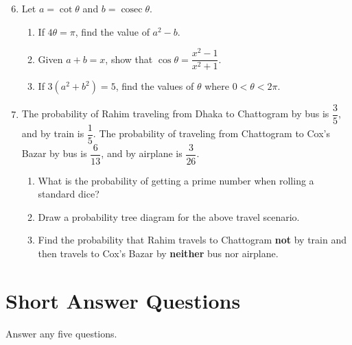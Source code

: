 \documentclass[12pt]{article}
\newcommand{\cosec}{\mathop{\mathrm{cosec}}}
\begin{document}
\begin{enumerate}
    \setcounter{enumi}{5}
    \item Let \( a = \cot\theta \) and \( b = \cosec\theta \).
    \begin{enumerate}
        \item If \( 4\theta = \pi \), find the value of \( a^2 - b \).
        \item Given \( a + b = x \), show that \( \cos\theta = \dfrac{x^2 - 1}{x^2 + 1} \).
        \item If \( 3(a^2 + b^2) = 5 \), find the values of \( \theta \) where \( 0 < \theta < 2\pi \).
    \end{enumerate}

    \item The probability of Rahim traveling from Dhaka to Chattogram by bus is \( \dfrac{3}{5} \), and by train is \( \dfrac{1}{5} \). The probability of traveling from Chattogram to Cox’s Bazar by bus is \( \dfrac{6}{13} \), and by airplane is \( \dfrac{3}{26} \).
    \begin{enumerate}
        \item What is the probability of getting a prime number when rolling a standard dice?
        \item Draw a probability tree diagram for the above travel scenario.
        \item Find the probability that Rahim travels to Chattogram \textbf{not} by train and then travels to Cox’s Bazar by \textbf{neither} bus nor airplane.
    \end{enumerate}
\end{enumerate}

\section*{Short Answer Questions}

Answer any five questions.
\end{document}
